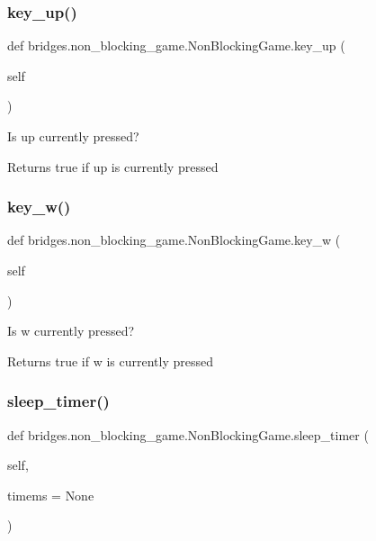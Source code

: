 \subsubsection{\texorpdfstring{key\_up()}{key\_up()}}
{\footnotesize\ttfamily def bridges.\+non\+\_\+blocking\+\_\+game.\+Non\+Blocking\+Game.\+key\+\_\+up (\begin{DoxyParamCaption}\item[{}]{self }\end{DoxyParamCaption})}



Is up currently pressed? 

\begin{DoxyReturn}{Returns}
true if up is currently pressed 
\end{DoxyReturn}
\mbox{\label{classbridges_1_1non__blocking__game_1_1_non_blocking_game_abeb435c75a3022c50f472ee2a4207809}} 
\subsubsection{\texorpdfstring{key\_w()}{key\_w()}}
{\footnotesize\ttfamily def bridges.\+non\+\_\+blocking\+\_\+game.\+Non\+Blocking\+Game.\+key\+\_\+w (\begin{DoxyParamCaption}\item[{}]{self }\end{DoxyParamCaption})}



Is w currently pressed? 

\begin{DoxyReturn}{Returns}
true if w is currently pressed 
\end{DoxyReturn}
\mbox{\label{classbridges_1_1non__blocking__game_1_1_non_blocking_game_a2e4dca6a290c65472200e69012e01d16}} 
\subsubsection{\texorpdfstring{sleep\_timer()}{sleep\_timer()}}
{\footnotesize\ttfamily def bridges.\+non\+\_\+blocking\+\_\+game.\+Non\+Blocking\+Game.\+sleep\+\_\+timer (\begin{DoxyParamCaption}\item[{}]{self,  }\item[{}]{timems = {\ttfamily None} }\end{DoxyParamCaption})}

